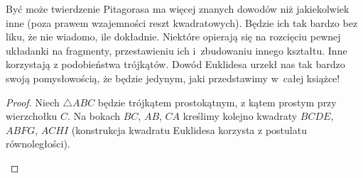 Być może twierdzenie Pitagorasa ma więcej znanych dowodów niż jakiekolwiek inne (poza prawem wzajemności reszt kwadratowych).
Będzie ich tak bardzo bez liku, że nie wiadomo, ile dokładnie.
Niektóre opierają się na rozcięciu pewnej układanki na fragmenty, przestawieniu ich i~zbudowaniu innego kształtu.
Inne korzystają z podobieństwa trójkątów.
Dowód Euklidesa urzekł nas tak bardzo swoją pomysłowością, że będzie jedynym, jaki przedstawimy w~całej książce!

\begin{proof}
    Niech $\triangle ABC$ będzie trójkątem prostokątnym, z kątem prostym przy wierzchołku $C$.
    Na bokach $BC$, $AB$, $CA$ kreślimy kolejno kwadraty $BCDE$, $ABFG$, $ACHI$ (konstrukcja kwadratu Euklidesa korzysta z postulatu równoległości).

    \begin{center}
\begin{comment}
            \begin{tikzpicture}[scale=.4]
        \tkzDefPoint(105:3){A}
        \tkzDefPoint(285:3){B}
        \tkzDefPoint(35:3){C}
        \tkzDefPoint(35:4.75){CC}

        \tkzLabelPoint[above left](A){$A$}
        \tkzLabelPoint[below](B){$B$}
        \tkzLabelPoint[below left](CC){$C$}
        \tkzDefSquare(B,A)
        \tkzGetPoints{G}{F}
        \tkzLabelPoint[below](F){$F$}
        \tkzLabelPoint[above](G){$G$}
        \tkzDefPointsBy[projection=onto A--B](C){K}
        \tkzDefPointsBy[projection=onto G--F](C){L}

        \tkzDrawPolygon[line width=0.3mm, fill=blue!10](A,K,L,G)
        \tkzDrawPolygon[line width=0.3mm, fill=red!10](B,K,L,F)
        \tkzDrawPolygon[line width=0.3mm](A,B,F,G)
        \tkzLabelPoint[below left](K){$K$}
        \tkzLabelPoint[left](L){$L$}



\end{comment}
\end{center}
\end{proof}
